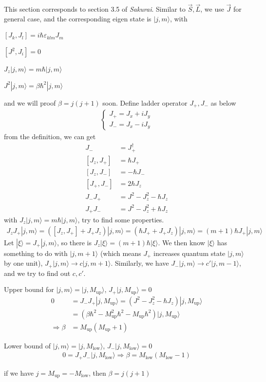 \documentclass[UTF8,12pt]{article} %
\numberwithin{equation}{section}
\begin{document}
This section corresponds to section 3.5 of \textit{Sakurai}. Similar to $\vec{S}, \vec{L}$, we use $\vec{J}$ for general case, and the corresponding eigen state is $|j,m\rangle$, with
\begin{enumerate*}
\item $[J_{k}, J_{l}] = i\hbar\varepsilon_{klm}J_{m}$
\item $[J^{2}, J_{i}] = 0$
\item $J_{z}|j,m\rangle = m\hbar|j,m\rangle$
\item $J^{2}|j,m\rangle = \beta\hbar^{2}|j,m\rangle$
\end{enumerate*}
and we will proof $\beta = j(j + 1)$ soon. Define ladder operator $J_{+}, J_{-}$ as below
\begin{align}
\begin{cases}
J_{+} = J_{x} + iJ_{y} \\
J_{-} = J_{x} - iJ_{y}
\end{cases}
\end{align}
from the definition, we can get
\begin{align}
J_{-} &= J_{+}^{\dag} \\
[J_{z}, J_{+}] &= \hbar J_{+} \\
[J_{z}, J_{-}] &= -\hbar J_{-} \\
[J_{+}, J_{-}] &= 2\hbar J_{z} \\
J_{-}J_{+} &= J^{2} - J_{z}^{2} - \hbar J_{z} \\
J_{+}J_{-} &= J^{2} - J_{z}^{2} + \hbar J_{z}
\end{align}
with $J_{z}|j,m\rangle = m\hbar|j,m\rangle$, try to find some properties.
\begin{align}
J_{z}J_{+}|j,m\rangle = \left([J_{z}, J_{+}] + J_{+}J_{z}\right)|j,m\rangle = (\hbar J_{+} + J_{+}J_{z})|j,m\rangle = (m+1)\hbar J_{+}|j,m\rangle
\end{align}
Let $|\xi\rangle = J_{+}|j,m\rangle$, so there is $J_{z}|\xi\rangle = (m+1)\hbar|\xi\rangle$. We then know $|\xi\rangle$ has something to do with $|j,m+1\rangle$ (which means $J_{+}$ increases quantum state $|j,m\rangle$ by one unit), $J_{+}|j,m\rangle \rightarrow c|j,m+1\rangle$. Similarly, we have $J_{-}|j,m\rangle \rightarrow c'|j,m-1\rangle$, and we try to find out $c, c'$.
\begin{enumerate*}
\item Upper bound for $|j,m\rangle = |j,M_{\text{up}}\rangle$, $J_{+}|j,M_{\text{up}}\rangle = 0$
\begin{align}
0 &= J_{-}J_{+}|j,M_{\text{up}}\rangle = \left(J^{2} - J_{z}^{2} - \hbar J_{z}\right)|j,M_{\text{up}}\rangle \\
&= \left(\beta\hbar^{2} - M_{\text{up}}^{2}\hbar^{2} - M_{\text{up}}\hbar^{2}\right)|j,M_{\text{up}}\rangle \\
\Rightarrow \beta &= M_{\text{up}}(M_{\text{up}} + 1)
\end{align}
\item Lower bound of $|j,m\rangle = |j,M_{\text{low}}\rangle$, $J_{-}|j,M_{\text{low}}\rangle = 0$
\begin{align}
0 = J_{+}J_{-}|j,M_{\text{low}}\rangle \Rightarrow \beta = M_{\text{low}}(M_{\text{low}} - 1) 
\end{align}
\end{enumerate*}
if we have $j = M_{\text{up}} = -M_{\text{low}}$, then $\beta = j(j+1)$
\end{document}
